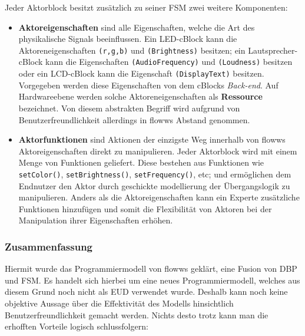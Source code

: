 Jeder Aktorblock besitzt zusätzlich zu seiner \ac{FSM} zwei weitere Komponenten:
\begin{itemize}
    \item \textbf{Aktoreigenschaften} sind alle Eigenschaften, welche die Art des physikalische Signals beeinflussen. Ein LED-cBlock kann die Aktoreneigenschaften \texttt{(r,g,b)} und \texttt{(Brightness)} besitzen; ein Lautsprecher-cBlock kann die Eigenschaften \texttt{(AudioFrequency)} und \texttt{(Loudness)} besitzen oder ein LCD-cBlock kann die Eigenschaft \texttt{(DisplayText)} besitzen. Vorgegeben werden diese Eigenschaften von dem cBlocks \textit{Back-end}. Auf Hardwareebene werden solche Aktoreneigenschaften als \textbf{Ressource} bezeichnet. Von diesem abstrakten Begriff wird aufgrund von Benutzerfreundlichkeit allerdings in flowws Abstand genommen.
    \item \textbf{Aktorfunktionen} sind Aktionen der einzigste Weg innerhalb von flowws Aktoreigenschaften direkt zu manipulieren. Jeder Aktorblock wird mit einem Menge von Funktionen geliefert. Diese bestehen aus Funktionen wie \texttt{setColor()}, \texttt{setBrightness()}, \texttt{setFrequency()}, etc; und ermöglichen dem Endnutzer den Aktor durch geschickte modellierung der Übergangslogik zu manipulieren. Anders als die Aktoreigenschaften kann ein Experte zusätzliche Funktionen hinzufügen und somit die Flexibilität von Aktoren bei der Manipulation ihrer Eigenschaften erhöhen.
\end{itemize}

\subsubsection{Zusammenfassung}
Hiermit wurde das Programmiermodell von flowws geklärt, eine Fusion von \ac{DBP} und \ac{FSM}. Es handelt sich hierbei um eine neues Programmiermodell, welches aus diesem Grund noch nicht als \ac{EUD} verwendet wurde. Deshalb kann noch keine objektive Aussage über die Effektivität des Modells hinsichtlich Benutzerfreundlichkeit gemacht werden. Nichts desto trotz kann man die erhofften Vorteile logisch schlussfolgern:


